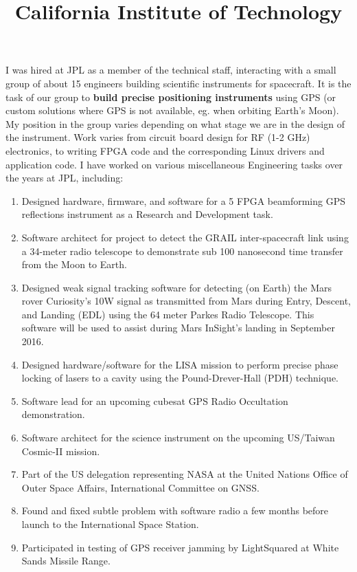 \begin{resume}
\title{\bf California Institute of Technology}
\begin{position}
    I was hired at JPL as a member of the technical staff, interacting with a small group of about 15 engineers building scientific instruments for spacecraft. It is the task of our group to {\bf build precise positioning instruments} using GPS (or custom solutions where GPS is not available, eg. when orbiting Earth's Moon). My position in the group varies depending on what stage we are in the design of the instrument. Work varies from circuit board design for RF (1-2 GHz) electronics, to writing FPGA code and the corresponding Linux drivers and application code. I have worked on various miscellaneous Engineering tasks over the years at JPL, including:
    \begin{enumerate}
            \item Designed hardware, firmware, and software for a 5 FPGA beamforming GPS reflections instrument as a Research and Development task.
            \item Software architect for project to detect the GRAIL inter-spacecraft link using a 34-meter radio telescope to demonstrate sub 100 nanosecond time transfer from the Moon to Earth.
            \item Designed weak signal tracking software for detecting (on Earth) the Mars rover Curiosity's 10W signal as transmitted from Mars during Entry, Descent, and Landing (EDL) using the 64 meter Parkes Radio Telescope. This software will be used to assist during Mars InSight's landing in September 2016.
            \item Designed hardware/software for the LISA mission to perform precise phase locking of lasers to a cavity using the Pound-Drever-Hall (PDH) technique.
            \item Software lead for an upcoming cubesat GPS Radio Occultation demonstration.
            \item Software architect for the science instrument on the upcoming US/Taiwan Cosmic-II mission.
            \item Part of the US delegation representing NASA at the United Nations Office of Outer Space Affairs, International Committee on GNSS.
            \item Found and fixed subtle problem with software radio a few months before launch to the International Space Station.
            \item Participated in testing of GPS receiver jamming by LightSquared at White Sands Missile Range.
    \end{enumerate}



\end{position}
\end{resume}
